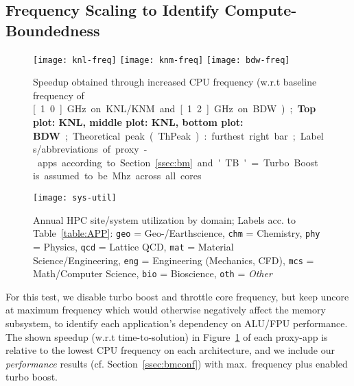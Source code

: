 \subsection{Frequency Scaling to Identify Compute-Boundedness}\label{ssec:eval_freq}
%
\begin{figure}[tbp]
    \centering
    \texttt{[image: knl-freq]}
    \texttt{[image: knm-freq]}
    \texttt{[image: bdw-freq]}
    \vspace*{-5mm}
    \caption{\label{fig:freq} Speedup obtained through increased CPU frequency (w.r.t baseline frequency of \unit[1.0]{GHz} on KNL/KNM and \unit[1.2]{GHz} on BDW); \textbf{Top plot: KNL, middle plot: KNL, bottom plot: BDW}; Theoretical peak (ThPeak): furthest right bar; Labels/abbreviations of proxy-apps according to Section~\ref{ssec:bm} and 'TB' = Turbo Boost is assumed to be \unit[100]{Mhz} across all cores}
    \vspace{-0.2em}
\end{figure}
%
\begin{figure}[tbp]
    \centering
    \texttt{[image: sys-util]}
    \vspace*{-7mm}
    \caption{\label{fid:disc:breakdown} Annual HPC site/system utilization by domain; Labels acc. to Table~\ref{table:APP}: \texttt{geo} = Geo-/Earthscience, \texttt{chm} = Chemistry, \texttt{phy} = Physics, \texttt{qcd} = Lattice QCD, \texttt{mat} = Material Science/Engineering, \texttt{eng} = Engineering (Mechanics, CFD), \texttt{mcs} = Math/Computer Science, \texttt{bio} = Bioscience, \texttt{oth} = \textit{Other}}
    \vspace{-1em}
\end{figure}
%
For this test, we disable turbo boost and throttle core frequency, but keep uncore at maximum frequency which would otherwise negatively
affect the memory subsystem, to identify each application's dependency on ALU/FPU performance. The shown speedup (w.r.t time-to-solution) in Figure~\ref{fig:freq}
of each proxy-app is relative to the lowest CPU frequency on each architecture, and we include our \textit{performance} results
(cf. Section~\ref{ssec:bmconf}) with max.~frequency plus enabled turbo boost.

